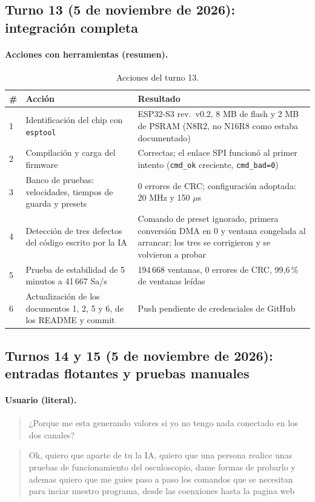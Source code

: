 \documentclass[12pt,a4paper]{article}
\begin{document}
\subsection{Turno 13 (5 de noviembre de 2026): integración completa}

\paragraph{Acciones con herramientas (resumen).}

\begin{table}[H]
\centering
\small
\begin{tabular}{@{}p{0.6cm} p{7.2cm} p{7.2cm}@{}}
\toprule
\textbf{\#} & \textbf{Acción} & \textbf{Resultado} \\
\midrule
1 & Identificación del chip con \texttt{esptool} & ESP32-S3 rev.~v0.2, 8 MB de flash y 2 MB de PSRAM (N8R2, no N16R8 como estaba documentado) \\
2 & Compilación y carga del firmware & Correctas; el enlace SPI funcionó al primer intento (\texttt{cmd\_ok} creciente, \texttt{cmd\_bad=0}) \\
3 & Banco de pruebas: velocidades, tiempos de guarda y presets & 0 errores de CRC; configuración adoptada: 20 MHz y 150 $\mu$s \\
4 & Detección de tres defectos del código escrito por la IA & Comando de preset ignorado, primera conversión DMA en 0 y ventana congelada al arrancar; los tres se corrigieron y se volvieron a probar \\
5 & Prueba de estabilidad de 5 minutos a 41\,667 Sa/s & 194\,668 ventanas, 0 errores de CRC, 99{,}6\,\% de ventanas leídas \\
6 & Actualización de los documentos 1, 2, 5 y 6, de los README y commit & Push pendiente de credenciales de GitHub \\
\bottomrule
\end{tabular}
\caption{Acciones del turno 13.}
\end{table}

\subsection{Turnos 14 y 15 (5 de noviembre de 2026): entradas flotantes y pruebas manuales}

\paragraph{Usuario (literal).}
\begin{quote}
¿Porque me esta generando valores si yo no tengo nada conectado en los dos canales?
\end{quote}
\begin{quote}
Ok, quiero que aparte de tu la IA, quiero que una persona realice unas pruebas de funcionamiento del osculoscopio, dame formas de probarlo y ademas quiero que me guies paso a paso los comandos que se necesitan para inciar nuestro programa, desde las coenxiones hasta la pagina web
\end{quote}
\end{document}
